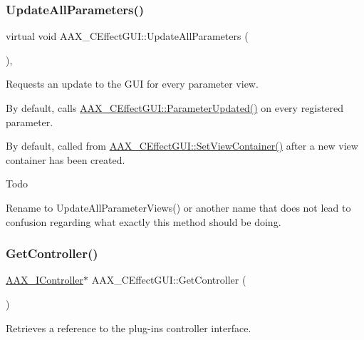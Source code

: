 \subsubsection{\texorpdfstring{UpdateAllParameters()}{UpdateAllParameters()}}
{\footnotesize\ttfamily virtual void A\+A\+X\+\_\+\+C\+Effect\+G\+U\+I\+::\+Update\+All\+Parameters (\begin{DoxyParamCaption}\item[{void}]{ }\end{DoxyParamCaption})\hspace{0.3cm}{\ttfamily [protected]}, {\ttfamily [virtual]}}



Requests an update to the G\+UI for every parameter view. 

By default, calls \mbox{\hyperlink{a01477_aa86943fbaf8920b533ea31a7669fb009}{A\+A\+X\+\_\+\+C\+Effect\+G\+U\+I\+::\+Parameter\+Updated()}} on every registered parameter.

By default, called from \mbox{\hyperlink{a01477_a5ba8d0cf5326583ed9e2a4b9752e4287}{A\+A\+X\+\_\+\+C\+Effect\+G\+U\+I\+::\+Set\+View\+Container()}} after a new view container has been created.

\begin{DoxyRefDesc}{Todo}
\item[\mbox{\hyperlink{a00785__todo000015}{Todo}}]Rename to {\ttfamily Update\+All\+Parameter\+Views()} or another name that does not lead to confusion regarding what exactly this method should be doing. \end{DoxyRefDesc}
\mbox{\label{a01477_aad788f844583cd929a1eef02f50e29dc}} 
\subsubsection{\texorpdfstring{GetController()}{GetController()}\hspace{0.1cm}{\footnotesize\ttfamily [1/2]}}
{\footnotesize\ttfamily \mbox{\hyperlink{a01789}{A\+A\+X\+\_\+\+I\+Controller}}$\ast$ A\+A\+X\+\_\+\+C\+Effect\+G\+U\+I\+::\+Get\+Controller (\begin{DoxyParamCaption}\item[{void}]{ }\end{DoxyParamCaption})}



Retrieves a reference to the plug-\/in\textquotesingle{}s controller interface. 

